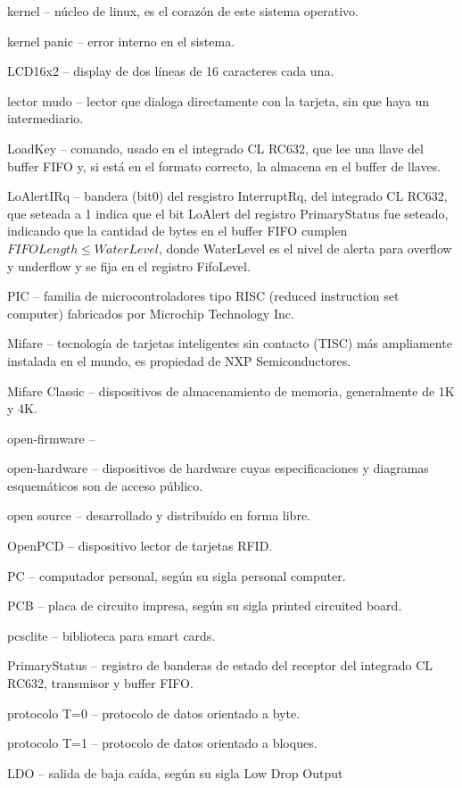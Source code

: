 \begin{glosario}
kernel – núcleo de linux, es el corazón de este sistema operativo.

kernel panic – error interno en el sistema.

LCD16x2 – display de dos líneas de 16 caracteres cada una.

lector mudo – lector que dialoga directamente con la tarjeta, sin que haya un intermediario.

LoadKey – comando, usado en el integrado CL RC632, que lee una llave del buffer FIFO y, si está en el formato correcto, la almacena en el buffer de llaves.

LoAlertIRq – bandera (bit0) del resgistro InterruptRq, del integrado CL RC632, que seteada a 1 indica que el bit LoAlert del registro PrimaryStatus fue seteado, indicando que la cantidad de bytes en el buffer FIFO cumplen $FIFOLength \leq WaterLevel $, donde WaterLevel es el nivel de alerta para overflow y underflow y se fija en el registro FifoLevel.

PIC – familia de microcontroladores tipo RISC (reduced instruction set computer) fabricados por Microchip Technology Inc.

Mifare – tecnología de tarjetas inteligentes sin contacto (TISC) más ampliamente instalada en el mundo, es propiedad de NXP Semiconductores.

Mifare Classic – dispositivos de almacenamiento de memoria, generalmente de 1K y 4K.

open-firmware – 

open-hardware – dispositivos de hardware cuyas especificaciones y diagramas esquemáticos son de acceso público.

open source – desarrollado y distribuído en forma libre.

OpenPCD – dispositivo lector de tarjetas RFID.

PC – computador personal, según su sigla personal computer.

PCB – placa de circuito impresa, según su sigla printed circuited board.

pcsclite – biblioteca para smart cards.

PrimaryStatus – registro de banderas de estado del receptor del integrado CL RC632, transmisor y buffer FIFO.

protocolo T=0 – protocolo de datos orientado a byte.

protocolo T=1 – protocolo de datos orientado a bloques.

LDO – salida de baja caída, según su sigla Low Drop Output


\end{glosario}
